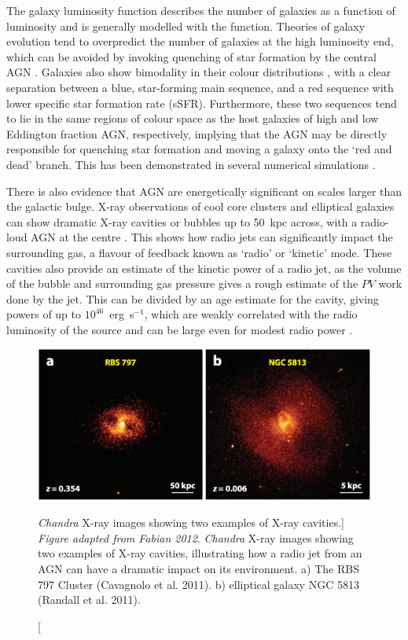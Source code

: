 The galaxy luminosity function describes
the number of galaxies as a function of luminosity and is generally modelled
with the \cite{schechter1976} function. Theories of 
galaxy evolution tend to overpredict the number of galaxies at the
high luminosity end, which can be avoided by invoking quenching
of star formation by the central AGN \citep[e.g.][]{read2005,bongiorno2016}.
Galaxies also show bimodality in their colour distributions 
\citep{strateva2001,bell2003a,baldry2004}, 
with a clear separation between a blue, star-forming
main sequence, and a red sequence with lower 
specific star formation rate (sSFR). Furthermore, these two 
sequences tend to lie in the same regions of colour space as the 
host galaxies of high and low 
Eddington fraction AGN, respectively, implying that the AGN may be 
directly responsible for quenching star formation and moving 
a galaxy onto the `red and dead' branch. This has been demonstrated in 
several numerical simulations \citep[e.g.][]{springel2005,croton2006}.

There is also evidence that AGN are energetically 
significant on scales larger than the galactic bulge. X-ray observations
of cool core clusters and elliptical galaxies
can show dramatic X-ray cavities or bubbles
up to 50~kpc across, with a radio-loud AGN at the centre
\citep[Fig.~\ref{fig:xray_bubbles}]{randall2011,cavagnolo2011,fabian2012}. This
shows how radio jets can significantly impact the surrounding gas,
a flavour of feedback known as `radio' or `kinetic' mode.
These cavities also provide an estimate of the kinetic power of a radio
jet, as the volume of the bubble and surrounding gas pressure gives a 
rough estimate of the $PV$ work done by the jet. This can be divided by
an age estimate for the cavity, giving powers
of up to $10^{46}$~erg~s$^{-1}$, which are weakly 
correlated with the radio luminosity of the source 
and can be large even for modest radio power \citep{birzan2008}. 

\begin{figure}
\centering
\includegraphics[width=1.0\textwidth]{figures/02-outflows/xray_cavities.png}
\caption
[{\sl Chandra} X-ray images showing two examples of X-ray cavities.]
{
{\sl Figure adapted from Fabian 2012}. 
{\sl Chandra} X-ray images showing two examples of X-ray cavities,
illustrating how a radio jet from an AGN can have a dramatic impact 
on its environment. a) The RBS 797 Cluster (Cavagnolo et al. 2011). 
b) elliptical galaxy NGC 5813 (Randall et al. 2011).
} 
\label{fig:xray_bubbles}
\end{figure}

